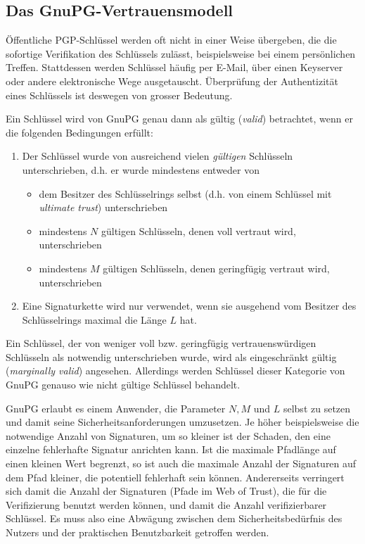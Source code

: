 \subsection{Das GnuPG-Vertrauensmodell}
\label{sec:das-gnupg-vertrauensmodell}

Öffentliche PGP-Schlüssel werden oft nicht in einer Weise übergeben,
die die sofortige Verifikation des Schlüssels zulässt, beispielsweise
bei einem persönlichen Treffen. Stattdessen werden Schlüssel häufig
per E-Mail, über einen Keyserver oder andere elektronische Wege
ausgetauscht.  Überprüfung der Authentizität eines Schlüssels ist
deswegen von grosser Bedeutung.


Ein Schlüssel wird von GnuPG genau dann als gültig (\emph{valid})
betrachtet, wenn er die folgenden Bedingungen erfüllt:

\begin{enumerate}
\item Der Schlüssel wurde von ausreichend vielen \emph{gültigen} Schlüsseln
  unterschrieben, d.h. er wurde mindestens entweder von
  \begin{itemize}
  \item dem Besitzer des Schlüsselrings selbst (d.h. von einem
    Schlüssel mit \emph{ultimate trust}) unterschrieben
  \item mindestens $N$ gültigen Schlüsseln, denen voll vertraut wird, unterschrieben
  \item mindestens $M$ gültigen Schlüsseln, denen geringfügig
    vertraut wird, unterschrieben
  \end{itemize}
\item Eine Signaturkette wird nur verwendet, wenn sie ausgehend vom
  Besitzer des Schlüsselrings maximal die Länge $L$ hat.
\end{enumerate}

Ein Schlüssel, der von weniger voll bzw. geringfügig
vertrauenswürdigen Schlüsseln als notwendig unterschrieben wurde, wird
als eingeschränkt gültig (\emph{marginally valid})
angesehen. Allerdings werden Schlüssel dieser Kategorie von GnuPG
genauso wie nicht gültige Schlüssel behandelt.

GnuPG erlaubt es einem Anwender, die Parameter $N, M$ und $L$ selbst
zu setzen und damit seine Sicherheitsanforderungen umzusetzen. Je
höher beispielsweise die notwendige Anzahl von Signaturen, um so
kleiner ist der Schaden, den eine einzelne fehlerhafte Signatur
anrichten kann. Ist die maximale Pfadlänge auf einen kleinen Wert
begrenzt, so ist auch die maximale Anzahl der Signaturen auf dem Pfad
kleiner, die potentiell fehlerhaft sein können. Andererseits
verringert sich damit die Anzahl der Signaturen (Pfade im Web of
Trust), die für die Verifizierung benutzt werden können, und damit die
Anzahl verifizierbarer Schlüssel. Es muss also eine Abwägung zwischen
dem Sicherheitsbedürfnis des Nutzers und der praktischen Benutzbarkeit
getroffen werden.

